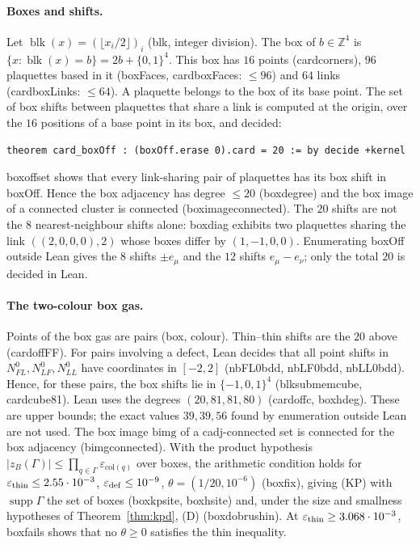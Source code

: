 \documentclass[11pt,a4paper]{article}
\theoremstyle{definition}
\theoremstyle{remark}
\DeclareRobustCommand{\lean}[1]{{\ttfamily\renewcommand{\_}{\textunderscore\allowbreak}#1}}
\newenvironment{leanquote}{\par\smallskip\footnotesize}{\par\smallskip}
\newcommand{\Z}{\mathbb{Z}}
\newcommand{\supp}{\operatorname{supp}}
\newcommand{\blk}{\operatorname{blk}}
\begin{document}
\paragraph{Boxes and shifts.} Let $\blk(x)=(\lfloor x_i/2\rfloor)_i$ (\lean{blk}, integer division). The box of $b\in\Z^4$ is $\{x:\blk(x)=b\}=2b+\{0,1\}^4$. This box has $16$ points (\lean{card\_corners}), $96$ plaquettes based in it (\lean{boxFaces}, \lean{card\_boxFaces}: $\le96$) and $64$ links (\lean{card\_boxLinks}: $\le64$). A plaquette belongs to the box of its base point. The set of box shifts between plaquettes that share a link is computed at the origin, over the $16$ positions of a base point in its box, and decided:
\begin{leanquote}
\begin{verbatim}
theorem card_boxOff : (boxOff.erase 0).card = 20 := by decide +kernel
\end{verbatim}
\end{leanquote}
\lean{box\_offset} shows that every link-sharing pair of plaquettes has its box shift in \lean{boxOff}. Hence the box adjacency has degree $\le20$ (\lean{box\_degree}) and the box image of a connected cluster is connected (\lean{box\_image\_connected}). The $20$ shifts are not the $8$ nearest-neighbour shifts alone: \lean{box\_diag} exhibits two plaquettes sharing the link $((2,0,0,0),2)$ whose boxes differ by $(1,-1,0,0)$. Enumerating \lean{boxOff} outside Lean gives the $8$ shifts $\pm e_\mu$ and the $12$ shifts $e_\mu-e_\nu$; only the total $20$ is decided in Lean.

\paragraph{The two-colour box gas.} Points of the box gas are pairs (box, colour). Thin--thin shifts are the $20$ above (\lean{card\_offFF}). For pairs involving a defect, Lean decides that all point shifts in $N_{FL}^0,N_{LF}^0,N_{LL}^0$ have coordinates in $[-2,2]$ (\lean{nbFL0\_bdd}, \lean{nbLF0\_bdd}, \lean{nbLL0\_bdd}). Hence, for these pairs, the box shifts lie in $\{-1,0,1\}^4$ (\lean{blk\_sub\_mem\_cube}, \lean{card\_cube81}). Lean uses the degrees $(20,81,81,80)$ (\lean{card\_offc}, \lean{box\_hdeg}). These are upper bounds; the exact values $39,39,56$ found by enumeration outside Lean are not used. The box image $\mathrm{bimg}$ of a \lean{cadj}-connected set is connected for the box adjacency (\lean{bimg\_connected}). With the product hypothesis $|z_B(\Gamma)|\le\prod_{q\in\Gamma}\varepsilon_{\mathrm{col}(q)}$ over boxes, the arithmetic condition holds for $\varepsilon_{\rm thin}\le2.55\cdot10^{-3}$, $\varepsilon_{\rm def}\le10^{-9}$, $\theta=(1/20,10^{-6})$ (\lean{box\_fix}), giving (KP) with $\supp\Gamma$ the set of boxes (\lean{box\_kp\_site}, \lean{box\_hsite}) and, under the size and smallness hypotheses of Theorem~\ref{thm:kpd}, (D) (\lean{box\_dobrushin}). At $\varepsilon_{\rm thin}\ge3.068\cdot10^{-3}$, \lean{box\_fails} shows that no $\theta\ge0$ satisfies the thin inequality.
\end{document}

